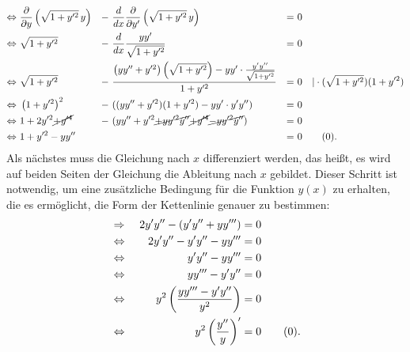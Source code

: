 \begin{align*}
	\Leftrightarrow &\
	\frac{\partial}{\partial y} \left( \sqrt{1 + y'^2} \, y \right) &- &\ \frac{d}{dx} \frac{\partial}{\partial y'} \left( \sqrt{1 + y'^2} \, y \right) 
	&= &\
	0
	\\
	\Leftrightarrow &\
	\sqrt{1 + y'^2} &- &\ \frac{d}{dx} \dfrac{yy'}{\sqrt{1 + y'^2}}
	&= &\
	0
	\\
	\Leftrightarrow &\
	\sqrt{1 + y'^2} &- &\ \frac{\left( y y'' + y'^2 \right) \left( \sqrt{1 + y'^2} \right) - y y' \cdot \frac{y' y''}{\sqrt{1 + y'^2}}}{1 + y'^2}
	&= &\
	0 \quad | \cdot (\sqrt{1 + y'^2})(1 + y'^2)
	\\
	\Leftrightarrow &\
	\left(1 + y'^2\right)^2 &- &\ ((y y'' + y'^2)(1 + y'^2) - y y' \cdot y' y'')
	&= &\
	0
	\\
	\Leftrightarrow &\
	1 + 2y'^2 \cancel{+y'^4} &- &\ (y y'' + y'^2 \cancel{+ yy'^2 y''} \cancel{+ y'^4} \cancel{- yy'^2 y''})
	&= &\
	0
	\\
	\Leftrightarrow &\
	1 + y'^2 - yy'' & &\
	&= &\
	0 \label{kettenlinie:equation_1} \tag{\theequation} \stepcounter{equation}.
\end{align*}
Als nächstes muss die Gleichung nach \(x\) differenziert werden, das heißt, es wird auf beiden Seiten der Gleichung die Ableitung nach \(x\) gebildet.
Dieser Schritt ist notwendig, um eine zusätzliche Bedingung für die Funktion \(y(x)\) zu erhalten, die es ermöglicht, die Form der Kettenlinie genauer zu bestimmen:
\begin{align*}
	&\Rightarrow &\
	2y'y'' - (y'y'' + yy''')
	&=
	0
	\\
	&\Leftrightarrow &\
	2y'y'' - y'y'' - yy'''
	&=
	0
	\\
	&\Leftrightarrow &\
	y'y'' - yy'''
	&=
	0
	\\
	&\Leftrightarrow &\
	yy''' - y'y''
	&=
	0
	\\
	&\Leftrightarrow &\
	y^2 \left(\dfrac{yy''' - y'y''}{y^2}\right)
	&=
	0
	\\
	&\Leftrightarrow &\
	y^2 \left(\dfrac{y''}{y}\right)'
	&=
	0 \label{kettenlinie:equation_2} \tag{\theequation} \stepcounter{equation}.
	\\
\end{align*}


